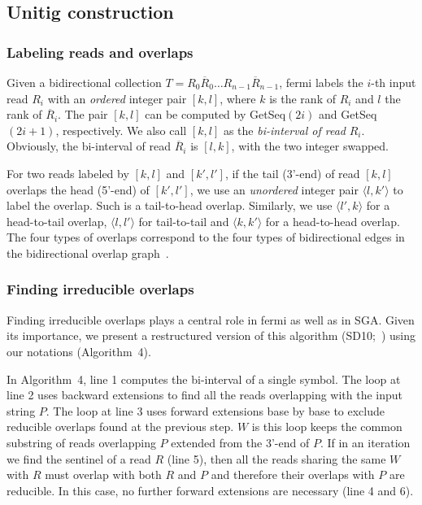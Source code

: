 \documentclass{bioinfo}
\begin{document}
\begin{methods}
\subsection{Unitig construction}

\subsubsection{Labeling reads and overlaps}
Given a bidirectional collection $T=R_0\overline{R}_0\ldots
R_{n-1}\overline{R}_{n-1}$, fermi labels the $i$-th input read $R_i$ with an
\emph{ordered} integer pair $[k,l]$, where $k$ is the rank of $R_i$
and $l$ the rank of $\overline{R}_i$. The pair $[k,l]$ can be computed by
{\sc GetSeq}$(2i)$ and {\sc GetSeq}$(2i+1)$, respectively. We also call
$[k,l]$ as the \emph{bi-interval of read} $R_i$. Obviously, the bi-interval
of read $\overline{R}_i$ is $[l,k]$, with the two integer swapped.

For two reads labeled by $[k,l]$ and $[k',l']$, if the tail (3'-end) of read
$[k,l]$ overlaps the head (5'-end) of $[k',l']$, we use an \emph{unordered}
integer pair $\langle l,k'\rangle$ to label the overlap. Such is a tail-to-head
overlap. Similarly, we use $\langle l',k\rangle$ for a head-to-tail overlap,
$\langle l,l'\rangle$ for tail-to-tail and $\langle k,k'\rangle$ for a
head-to-head overlap. The four types of overlaps correspond to the four
types of bidirectional edges in the bidirectional overlap
graph~\citep{Myers:1995nx}.

\subsubsection{Finding irreducible overlaps}
Finding irreducible overlaps plays a central role in fermi as well as in SGA.
Given its importance, we present a restructured version of this algorithm
(SD10;~\citealt{Simpson:2010uq}) using our notations (Algorithm~4).

In Algorithm~4, line 1 computes the bi-interval of a single symbol. The loop at
line 2 uses backward extensions to find all the reads overlapping with the
input string $P$. The loop at line 3 uses forward extensions base by base to exclude
reducible overlaps found at the previous step. $W$ is this loop keeps
the common substring of reads overlapping $P$ extended from the 3'-end of $P$. If 
in an iteration we find the sentinel of a read $R$ (line 5), then all the reads sharing
the same $W$ with $R$ must overlap with both $R$ and $P$ and therefore
their overlaps with $P$ are reducible. In this case, no further forward
extensions are necessary (line 4 and 6).


\end{methods}
\end{document}
